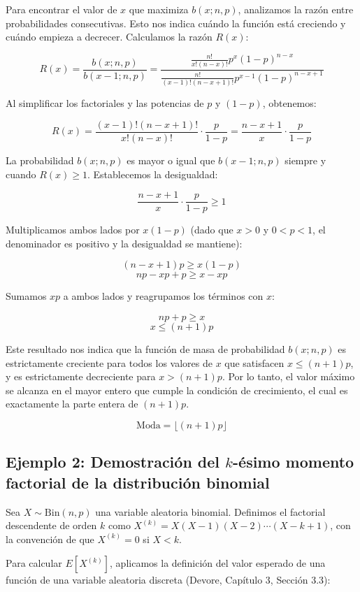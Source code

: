 Para encontrar el valor de $x$ que maximiza $b(x; n, p)$, analizamos la razón entre probabilidades consecutivas. Esto nos indica cuándo la función está creciendo y cuándo empieza a decrecer. Calculamos la razón $R(x)$:

$$ R(x) = \frac{b(x; n, p)}{b(x-1; n, p)} = \frac{\frac{n!}{x!(n-x)!} p^x (1-p)^{n-x}}{\frac{n!}{(x-1)!(n-x+1)!} p^{x-1} (1-p)^{n-x+1}} $$

Al simplificar los factoriales y las potencias de $p$ y $(1-p)$, obtenemos:

$$ R(x) = \frac{(x-1)!(n-x+1)!}{x!(n-x)!} \cdot \frac{p}{1-p} = \frac{n-x+1}{x} \cdot \frac{p}{1-p} $$

La probabilidad $b(x; n, p)$ es mayor o igual que $b(x-1; n, p)$ siempre y cuando $R(x) \ge 1$. Establecemos la desigualdad:

$$ \frac{n-x+1}{x} \cdot \frac{p}{1-p} \ge 1 $$

Multiplicamos ambos lados por $x(1-p)$ (dado que $x > 0$ y $0 < p < 1$, el denominador es positivo y la desigualdad se mantiene):

$$ (n-x+1)p \ge x(1-p) $$
$$ np - xp + p \ge x - xp $$

Sumamos $xp$ a ambos lados y reagrupamos los términos con $x$:

$$ np + p \ge x $$
$$ x \le (n+1)p $$

Este resultado nos indica que la función de masa de probabilidad $b(x; n, p)$ es estrictamente creciente para todos los valores de $x$ que satisfacen $x \le (n+1)p$, y es estrictamente decreciente para $x > (n+1)p$. Por lo tanto, el valor máximo se alcanza en el mayor entero que cumple la condición de crecimiento, el cual es exactamente la parte entera de $(n+1)p$.

$$ \text{Moda} = \lfloor (n+1)p \rfloor $$

\subsection{Ejemplo 2: Demostración del $k$-ésimo momento factorial de la distribución binomial}

Sea $X \sim \text{Bin}(n, p)$ una variable aleatoria binomial. Definimos el factorial descendente de orden $k$ como $X^{(k)} = X(X-1)(X-2)\cdots(X-k+1)$, con la convención de que $X^{(k)} = 0$ si $X < k$. 

Para calcular $E[X^{(k)}]$, aplicamos la definición del valor esperado de una función de una variable aleatoria discreta (Devore, Capítulo 3, Sección 3.3):

